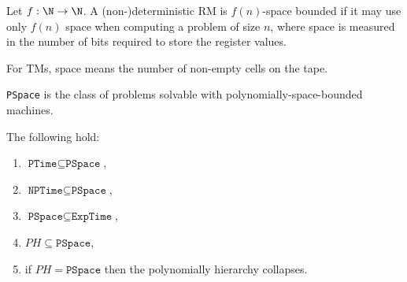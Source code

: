 \documentclass{article}
\begin{document}
\begin{definition*}
	Let $f:\N\to\N$.
	A (non-)deterministic RM is $f(n)$-space bounded if it may use only $f(n)$ 
	space when computing a problem of size $n$, where space is measured in the
	number of bits required to store the register values.

	For TMs, space means the number of non-empty cells on the tape.

	\texttt{PSpace} is the class of problems solvable with polynomially-space-bounded
	machines.
\end{definition*}

\begin{theorem*}[II.28]
	The following hold:
	\begin{enumerate}
		\item $\texttt{PTime}\subseteq\texttt{PSpace}$,
		\item $\texttt{NPTime}\subseteq\texttt{PSpace}$,
		\item $\texttt{PSpace}\subseteq\texttt{ExpTime}$,
		\item $PH\subseteq\texttt{PSpace}$,
		\item if $PH=\texttt{PSpace}$ then the polynomially hierarchy collapses.
	\end{enumerate}	
\end{theorem*}
\end{document}
